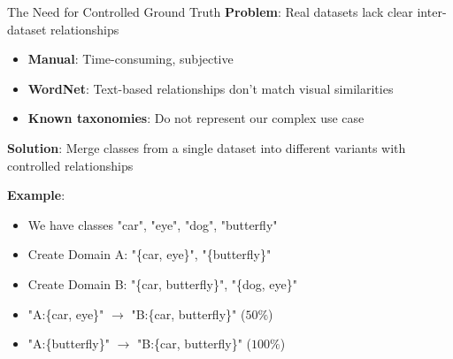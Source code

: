 \documentclass[aspectratio=169]{beamer}
\begin{document}
\begin{frame}{The Need for Controlled Ground Truth}
    \textbf{Problem}: Real datasets lack clear inter-dataset relationships

    \begin{itemize}
        \item \textbf{Manual}: Time-consuming, subjective
        \item \textbf{WordNet}: Text-based relationships don't match visual similarities
        \item \textbf{Known taxonomies}: Do not represent our complex use case
    \end{itemize}

    \vspace{1em}

    \textbf{Solution}: Merge classes from a single dataset into different variants with controlled relationships

    \vspace{1em}

    \textbf{Example}:

    \begin{itemize}
        \item We have classes "car", "eye", "dog", "butterfly"
        \item Create Domain A: "\{car, eye\}", "\{butterfly\}"
        \item Create Domain B: "\{car, butterfly\}", "\{dog, eye\}"
        \item "A:\{car, eye\}" $\rightarrow$ "B:\{car, butterfly\}" ($50\%$)
        \item "A:\{butterfly\}" $\rightarrow$ "B:\{car, butterfly\}" ($100\%$)
    \end{itemize}
\end{frame}
\end{document}
